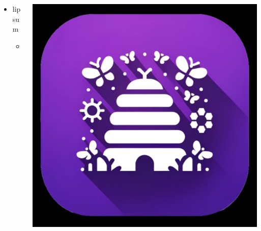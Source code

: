 \documentclass[aspectratio=169]{beamer}
\begin{document}
\begin{frame}{2}

\begin{columns}[T]
    \begin{column}[T]{0.5\textwidth}
        \begin{itemize}
            \item lipsum
            \begin{itemize}
                \item example
            \end{itemize}
\end{itemize}
    \end{column}
    
    \begin{column}{0.5\textwidth}
        \includegraphics[height=0.8\textheight]{imgs/app_icons/2.png}
    \end{column}
\end{columns}

\end{frame}
\end{document}
